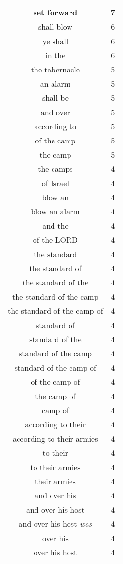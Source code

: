 \begin{center}
\begin{longtable}{|c|c|}
set forward & 7\\ \hline 
shall blow & 6\\ \hline 
ye shall & 6\\ \hline 
in the & 6\\ \hline 
the tabernacle & 5\\ \hline 
an alarm & 5\\ \hline 
shall be & 5\\ \hline 
and over & 5\\ \hline 
according to & 5\\ \hline 
of the camp & 5\\ \hline 
the camp & 5\\ \hline 
the camps & 4\\ \hline 
of Israel & 4\\ \hline 
blow an & 4\\ \hline 
blow an alarm & 4\\ \hline 
and the & 4\\ \hline 
of the LORD & 4\\ \hline 
the standard & 4\\ \hline 
the standard of & 4\\ \hline 
the standard of the & 4\\ \hline 
the standard of the camp & 4\\ \hline 
the standard of the camp of & 4\\ \hline 
standard of & 4\\ \hline 
standard of the & 4\\ \hline 
standard of the camp & 4\\ \hline 
standard of the camp of & 4\\ \hline 
of the camp of & 4\\ \hline 
the camp of & 4\\ \hline 
camp of & 4\\ \hline 
according to their & 4\\ \hline 
according to their armies & 4\\ \hline 
to their & 4\\ \hline 
to their armies & 4\\ \hline 
their armies & 4\\ \hline 
and over his & 4\\ \hline 
and over his host & 4\\ \hline 
and over his host \emph{was} & 4\\ \hline 
over his & 4\\ \hline 
over his host & 4\\ \hline 

\end{longtable}
\end{center}
